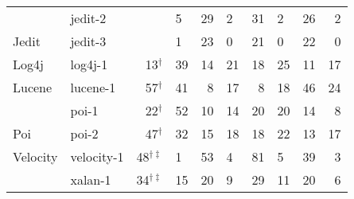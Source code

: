 \begin{figure*}[t]
{{\begin{tabular}{|rl|rl|rl|rl|rr}
\multicolumn{1}{|l|}{}                         & jedit-2    & \cellcolor[HTML]{C0C0C0}{\color[HTML]{000000} 66$^{\dagger\ddagger}$} & 5                                                & 29           & 2           & 31            & 2             & 26            & 2             \\
\multicolumn{1}{|l|}{\multirow{-3}{*}{Jedit}}  & jedit-3    & \cellcolor[HTML]{C0C0C0}{\color[HTML]{000000} 73$^{\dagger}$} & 1                                                & 23           & 0           & 21            & 0             & 22            & 0             \bigstrut[b]\\ \hline
\multicolumn{1}{|l|}{Log4j}                    & log4j-1    & 13$^{\dagger}$                                                                      & \cellcolor[HTML]{C0C0C0}39 & 14            & 21          & 18             & 25            & 11            & 17            \bigstrut\\ \hline
\multicolumn{1}{|l|}{Lucene}                   & lucene-1   & \cellcolor[HTML]{C0C0C0}57$^{\dagger}$                        & 41                                               & 8            & 17          & 8             & 18            & 46            & 24            \bigstrut\\ \hline
\multicolumn{1}{|l|}{}                         & poi-1      & 22$^{\dagger}$                                                                      & \cellcolor[HTML]{C0C0C0}52 & 10           & 14          & 20            & 20            & 14             & 8             \bigstrut[t]\\
\multicolumn{1}{|l|}{\multirow{-2}{*}{Poi}}    & poi-2      & \cellcolor[HTML]{C0C0C0}47$^{\dagger}$                        & 32                                               & 15            & 18           & 18             & 22             & 13            & 17             \bigstrut[b]\\ \hline
\multicolumn{1}{|l|}{Velocity}                 & velocity-1 & \cellcolor[HTML]{C0C0C0}48$^{\dagger\ddagger}$                        & 1                                                & 53            & 4           & 81             & 5             & 39            & 3            \bigstrut\\ \hline
\multicolumn{1}{|l|}{}                         & xalan-1    & \cellcolor[HTML]{C0C0C0}34$^{\dagger\ddagger}$                                              & 15                                               & 20           & 9           & 29             & 11             & 20            & 6             \bigstrut[t]\\

\end{tabular}}}
\end{figure*}
